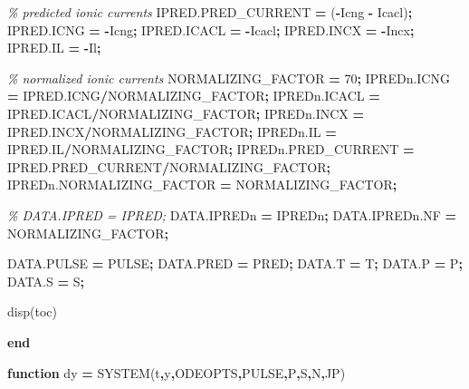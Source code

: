 \documentclass[
]{article}
\newenvironment{Shaded}{\begin{snugshade}}{\end{snugshade}}
\newcommand{\CommentTok}[1]{\textcolor[rgb]{0.56,0.35,0.01}{\textit{#1}}}
\newcommand{\ControlFlowTok}[1]{\textcolor[rgb]{0.13,0.29,0.53}{\textbf{#1}}}
\newcommand{\FloatTok}[1]{\textcolor[rgb]{0.00,0.00,0.81}{#1}}
\newcommand{\FunctionTok}[1]{\textcolor[rgb]{0.00,0.00,0.00}{#1}}
\newcommand{\NormalTok}[1]{#1}
\newcommand{\OperatorTok}[1]{\textcolor[rgb]{0.81,0.36,0.00}{\textbf{#1}}}
\begin{document}
\begin{Shaded}
\begin{Highlighting}[]
\CommentTok{\% predicted ionic currents}
\NormalTok{IPRED.PRED\_CURRENT }\OperatorTok{=}\NormalTok{ (}\OperatorTok{{-}}\NormalTok{Icng }\OperatorTok{{-}}\NormalTok{ Icacl)}\OperatorTok{;}
\NormalTok{IPRED.ICNG }\OperatorTok{=} \OperatorTok{{-}}\NormalTok{Icng}\OperatorTok{;}
\NormalTok{IPRED.ICACL }\OperatorTok{=} \OperatorTok{{-}}\NormalTok{Icacl}\OperatorTok{;}
\NormalTok{IPRED.INCX }\OperatorTok{=} \OperatorTok{{-}}\NormalTok{Incx}\OperatorTok{;}
\NormalTok{IPRED.IL }\OperatorTok{=} \OperatorTok{{-}}\NormalTok{Il}\OperatorTok{;}

\CommentTok{\% normalized ionic currents}
\NormalTok{NORMALIZING\_FACTOR }\OperatorTok{=} \FloatTok{70}\OperatorTok{;}
\NormalTok{IPREDn.ICNG }\OperatorTok{=}\NormalTok{ IPRED.ICNG}\OperatorTok{/}\NormalTok{NORMALIZING\_FACTOR}\OperatorTok{;}
\NormalTok{IPREDn.ICACL }\OperatorTok{=}\NormalTok{ IPRED.ICACL}\OperatorTok{/}\NormalTok{NORMALIZING\_FACTOR}\OperatorTok{;}
\NormalTok{IPREDn.INCX }\OperatorTok{=}\NormalTok{ IPRED.INCX}\OperatorTok{/}\NormalTok{NORMALIZING\_FACTOR}\OperatorTok{;}
\NormalTok{IPREDn.IL }\OperatorTok{=}\NormalTok{ IPRED.IL}\OperatorTok{/}\NormalTok{NORMALIZING\_FACTOR}\OperatorTok{;}    
\NormalTok{IPREDn.PRED\_CURRENT }\OperatorTok{=}\NormalTok{ IPRED.PRED\_CURRENT}\OperatorTok{/}\NormalTok{NORMALIZING\_FACTOR}\OperatorTok{;}
\NormalTok{IPREDn.NORMALIZING\_FACTOR }\OperatorTok{=}\NormalTok{ NORMALIZING\_FACTOR}\OperatorTok{;}

\CommentTok{\% DATA.IPRED = IPRED;}
\NormalTok{DATA.IPREDn }\OperatorTok{=}\NormalTok{ IPREDn}\OperatorTok{;}
\NormalTok{DATA.IPREDn.NF }\OperatorTok{=}\NormalTok{ NORMALIZING\_FACTOR}\OperatorTok{;}

\NormalTok{DATA.PULSE }\OperatorTok{=}\NormalTok{ PULSE}\OperatorTok{;}
\NormalTok{DATA.PRED }\OperatorTok{=}\NormalTok{ PRED}\OperatorTok{;}
\NormalTok{DATA.T }\OperatorTok{=}\NormalTok{ T}\OperatorTok{;}
\NormalTok{DATA.P }\OperatorTok{=}\NormalTok{ P}\OperatorTok{;}
\NormalTok{DATA.S }\OperatorTok{=}\NormalTok{ S}\OperatorTok{;}

\FunctionTok{disp}\NormalTok{(}\FunctionTok{toc}\NormalTok{)}

\ControlFlowTok{end}

\ControlFlowTok{function}\NormalTok{ dy }\OperatorTok{=}\NormalTok{ SYSTEM(t}\OperatorTok{,}\NormalTok{y}\OperatorTok{,}\NormalTok{ODEOPTS}\OperatorTok{,}\NormalTok{PULSE}\OperatorTok{,}\NormalTok{P}\OperatorTok{,}\NormalTok{S}\OperatorTok{,}\NormalTok{N}\OperatorTok{,}\NormalTok{JP)}
    

\end{Highlighting}
\end{Shaded}
\end{document}
